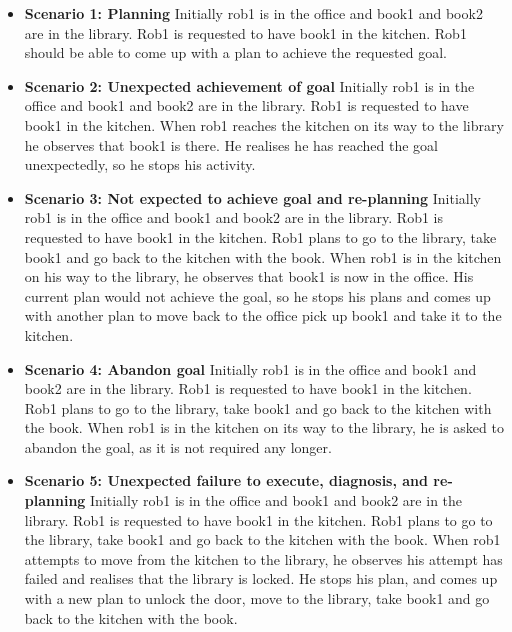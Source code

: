 \documentclass[11pt, oneside]{article}
\begin{document}
\begin{itemize}
\item \textbf{Scenario 1: Planning}\newline
Initially rob1 is in the office and book1 and book2 are in the library.  Rob1 is requested to have book1 in the kitchen. Rob1 should be able to come up with a plan to achieve the requested goal.

\item \textbf{Scenario 2: Unexpected achievement of goal}\newline
Initially rob1 is in the office and book1 and book2 are in the library.  Rob1 is requested to have book1 in the kitchen.  When rob1 reaches the kitchen on its way to the library he observes that book1 is there. He realises he has reached the goal unexpectedly, so he stops his activity.

\item \textbf{Scenario 3: Not expected to achieve goal and re-planning}\newline
Initially rob1 is in the office and book1 and book2 are in the library.  Rob1 is requested to have book1 in the kitchen. Rob1 plans to go to the library, take book1 and go back to the kitchen with the book. When rob1 is in the kitchen on his way to the library, he observes that book1 is now in the office. His current plan would not achieve the goal, so he stops his plans and comes up with another plan to move back to the office pick up book1  and take it to the kitchen.

\item \textbf{Scenario 4: Abandon goal}\newline
Initially rob1 is in the office and book1 and book2 are in the library.  Rob1 is requested to have book1 in the kitchen.  Rob1 plans to go to the library, take book1 and go back to the kitchen with the book. When rob1 is in the kitchen on its way to the library, he is asked to abandon the goal, as it is not required any longer. 

\item \textbf{Scenario 5: Unexpected failure to execute, diagnosis, and re-planning}\newline
Initially rob1 is in the office and book1 and book2 are in the library.  Rob1 is requested to have book1 in the kitchen.  Rob1 plans to go to the library, take book1 and go back to the kitchen with the book. When rob1 attempts to move from the kitchen to the library, he observes his attempt has failed and realises that the library is locked. He stops his plan, and comes up with a new plan to unlock the door, move to the library,  take book1 and go back to the kitchen with the book.


\end{itemize}
\end{document}
